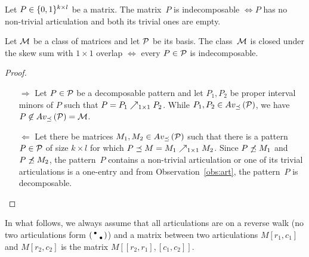 \begin{obs}
\label{obs:art}
Let $P\in\{0,1\}^{k\times l}$ be a matrix. The matrix~$P$ is indecomposable $\Leftrightarrow P$ has no non-trivial articulation and both its trivial ones are empty.
\end{obs}

\begin{lemma}
\label{lemma:rel}
Let $\mathcal{M}$ be a class of matrices and let $\mathcal{P}$ be its basis. The class~$\mathcal{M}$ is closed under the skew sum with $1\times1$ overlap $\Leftrightarrow$ every $P\in\mathcal{P}$ is indecomposable.
\end{lemma}
\begin{proof}
\begin{itemize}
	\item[$\Rightarrow$] Let $P\in\mathcal{P}$ be a decomposable pattern and let $P_1,P_2$ be proper interval minors of $P$ such that $P=P_1\nearrow_{1\times1}P_2$. While $P_1,P_2\in Av_{\preceq}\left(\mathcal{P}\right)$, we have $P\not\in Av_{\preceq}\left(\mathcal{P}\right)=\mathcal{M}$.
	\item[$\Leftarrow$] Let there be matrices $M_1,M_2\in Av_{\preceq}\left(\mathcal{P}\right)$ such that there is a pattern~$P\in\mathcal{P}$ of size $k\times l$ for which $P\preceq M=M_1\nearrow_{1\times1}M_2$. Since $P\not\preceq M_1$ and $P\not\preceq M_2$, the pattern~$P$ contains a non-trivial articulation or one of its trivial articulations is a one-entry and from Observation~\ref{obs:art}, the pattern~$P$ is decomposable. \qedhere
\end{itemize}
\end{proof}

In what follows, we always assume that all articulations are on a reverse walk (no two articulations form $\left(\begin{smallmatrix}\bullet& \\ &\bullet\end{smallmatrix}\right)$) and a matrix between two articulations $M[r_1,c_1]$ and $M[r_2,c_2]$ is the matrix $M[[r_2,r_1],[c_1,c_2]]$.

